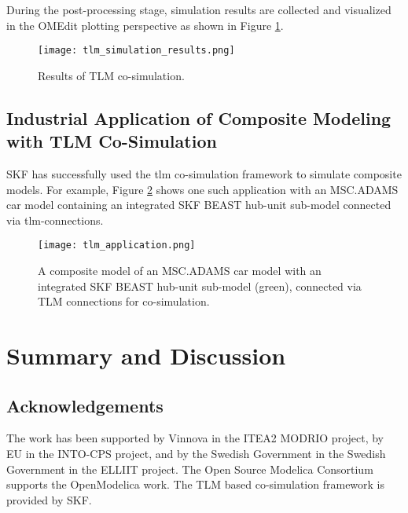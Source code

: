 During the post-processing stage, simulation results are collected and visualized in the OMEdit 
plotting perspective as shown in Figure \ref{fig:tlmsimulationresults}.
 
\begin{figure}
	\texttt{[image: tlm\_simulation\_results.png]}
	\caption{Results of TLM co-simulation.}
	\label{fig:tlmsimulationresults}
\end{figure}


\subsection{Industrial Application of Composite Modeling with TLM Co-Simulation}
\label{sec:tlmapplication}

SKF has successfully used the \acrshort{tlm} co-simulation framework to simulate composite models. For
example, Figure \ref{fig:tlmapplication} shows one such application with an MSC.ADAMS \cite{adams} car model
containing an integrated SKF BEAST\cite{beast} hub-unit sub-model 
connected via \acrshort{tlm}-connections.

\begin{figure}
	\texttt{[image: tlm\_application.png]}
	\caption{A composite model of an MSC.ADAMS car model with an integrated SKF BEAST hub-unit sub-model (green), connected 
		     via TLM connections for co-simulation.}
	\label{fig:tlmapplication}
\end{figure}

\section{Summary and Discussion}
\label{sec:tlmsummary}

\subsection*{Acknowledgements}
\label{sec:tlmAcknowledgements}

The work has been supported by Vinnova in the ITEA2
MODRIO project, by EU in the INTO-CPS project,
and by the Swedish Government in the Swedish
Government in the ELLIIT project. The Open Source Modelica Consortium supports the OpenModelica
work. The TLM based co-simulation framework is provided by SKF.





